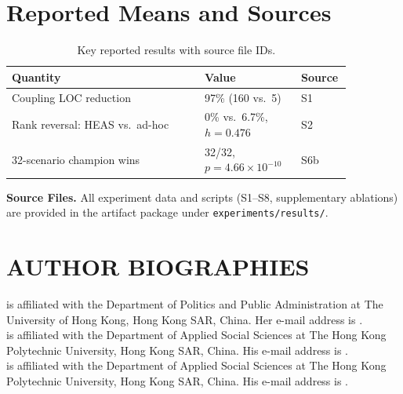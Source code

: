 \documentclass{wscpaperproc}
\begin{document}
\appendix
\section{Reported Means and Sources}

\begin{table}[ht]
\caption{Key reported results with source file IDs.}
\label{tab:appendix-results}
\centering\small
\begin{tabular}{p{0.52\linewidth}p{0.26\linewidth}p{0.08\linewidth}}
\toprule
Quantity & Value & Source \\
\midrule
Coupling LOC reduction & 97\% (160 vs.\ 5) & S1 \\
Rank reversal: HEAS vs.\ ad-hoc & 0\% vs.\ 6.7\%, $h\!=\!0.476$ & S2 \\
32-scenario champion wins & 32/32, $p\!=\!4.66\!\times\!10^{-10}$ & S6b \\
\bottomrule
\end{tabular}
\end{table}

\noindent\textbf{Source Files.} All experiment data and scripts (S1--S8, supplementary ablations)
are provided in the artifact package under \texttt{experiments/results/}.

\begingroup
\small


\endgroup

\section*{AUTHOR BIOGRAPHIES}

 is affiliated with the Department of Politics and Public Administration at The University of Hong Kong, Hong Kong SAR, China. Her e-mail address is .\\

 is affiliated with the Department of Applied Social Sciences at The Hong Kong Polytechnic University, Hong Kong SAR, China. His e-mail address is .\\

 is affiliated with the Department of Applied Social Sciences at The Hong Kong Polytechnic University, Hong Kong SAR, China. His e-mail address is .
\end{document}
